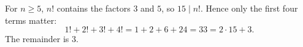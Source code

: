 For $n\ge5$, $n!$ contains the factors $3$ and $5$, so $15\mid n!$. Hence only the first four terms matter:
\[
1!+2!+3!+4!=1+2+6+24=33=2\cdot15+3 .
\]
The remainder is $\boxed{3}$.
